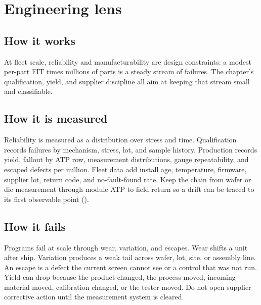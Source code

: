 \section{Engineering lens}
\label{sec:reliability-engineering-lens}

\subsection{How it works}

At fleet scale, reliability and manufacturability are design constraints: a modest
per-part FIT times millions of parts is a steady stream of failures. The chapter's
qualification, yield, and supplier discipline all aim at keeping that stream small
and classifiable.

\subsection{How it is measured}
\label{sec:reliability-how-measured}

Reliability is measured as a distribution over stress and time. Qualification
records failures by mechanism, stress, lot, and sample history. Production records
yield, fallout by ATP row, measurement distributions, gauge repeatability, and
escaped defects per million. Fleet data add install age, temperature, firmware,
supplier lot, return code, and no-fault-found rate. Keep the chain from wafer or
die measurement through module ATP to field return so a drift can be traced to its
first observable point ().

\subsection{How it fails}
\label{sec:reliability-how-fails}

Programs fail at scale through wear, variation, and escapes. Wear shifts a unit
after ship. Variation produces a weak tail across wafer, lot, site, or assembly
line. An escape is a defect the current screen cannot see or a control that was not
run. Yield can drop because the product changed, the process moved, incoming
material moved, calibration changed, or the tester moved. Do not open supplier
corrective action until the measurement system is cleared.


